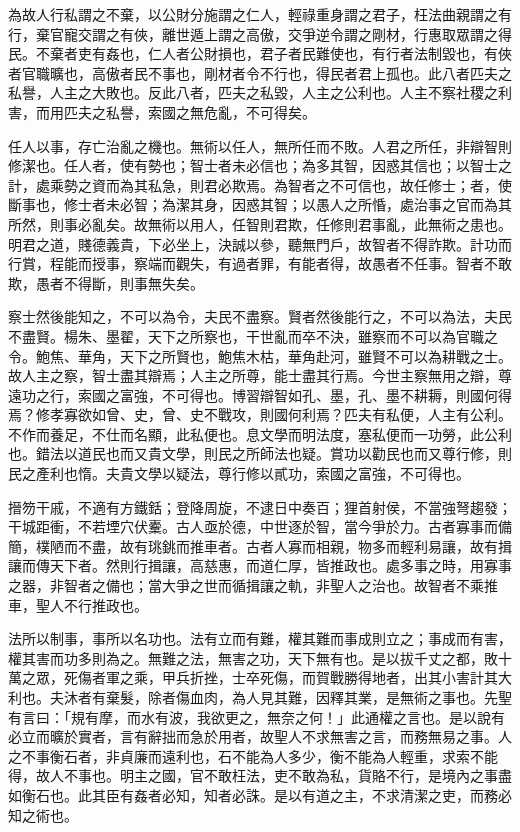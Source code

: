 
\begin{pinyinscope}
為故人行私謂之不棄，以公財分施謂之仁人，輕祿重身謂之君子，枉法曲親謂之有行，棄官寵交謂之有俠，離世遁上謂之高傲，交爭逆令謂之剛材，行惠取眾謂之得民。不棄者吏有姦也，仁人者公財損也，君子者民難使也，有行者法制毀也，有俠者官職曠也，高傲者民不事也，剛材者令不行也，得民者君上孤也。此八者匹夫之私譽，人主之大敗也。反此八者，匹夫之私毀，人主之公利也。人主不察社稷之利害，而用匹夫之私譽，索國之無危亂，不可得矣。

任人以事，存亡治亂之機也。無術以任人，無所任而不敗。人君之所任，非辯智則修潔也。任人者，使有勢也；智士者未必信也；為多其智，因惑其信也；以智士之計，處乘勢之資而為其私急，則君必欺焉。為智者之不可信也，故任修士；者，使斷事也，修士者未必智；為潔其身，因惑其智；以愚人之所惛，處治事之官而為其所然，則事必亂矣。故無術以用人，任智則君欺，任修則君事亂，此無術之患也。明君之道，賤德義貴，下必坐上，決誠以參，聽無門戶，故智者不得詐欺。計功而行賞，程能而授事，察端而觀失，有過者罪，有能者得，故愚者不任事。智者不敢欺，愚者不得斷，則事無失矣。

察士然後能知之，不可以為令，夫民不盡察。賢者然後能行之，不可以為法，夫民不盡賢。楊朱、墨翟，天下之所察也，干世亂而卒不決，雖察而不可以為官職之令。鮑焦、華角，天下之所賢也，鮑焦木枯，華角赴河，雖賢不可以為耕戰之士。故人主之察，智士盡其辯焉；人主之所尊，能士盡其行焉。今世主察無用之辯，尊遠功之行，索國之富強，不可得也。博習辯智如孔、墨，孔、墨不耕耨，則國何得焉？修孝寡欲如曾、史，曾、史不戰攻，則國何利焉？匹夫有私便，人主有公利。不作而養足，不仕而名顯，此私便也。息文學而明法度，塞私便而一功勞，此公利也。錯法以道民也而又貴文學，則民之所師法也疑。賞功以勸民也而又尊行修，則民之產利也惰。夫貴文學以疑法，尊行修以貳功，索國之富強，不可得也。

搢笏干戚，不適有方鐵銛；登降周旋，不逮日中奏百；狸首射侯，不當強弩趨發；干城距衝，不若堙穴伏櫜。古人亟於德，中世逐於智，當今爭於力。古者寡事而備簡，樸陋而不盡，故有珧銚而推車者。古者人寡而相親，物多而輕利易讓，故有揖讓而傳天下者。然則行揖讓，高慈惠，而道仁厚，皆推政也。處多事之時，用寡事之器，非智者之備也；當大爭之世而循揖讓之軌，非聖人之治也。故智者不乘推車，聖人不行推政也。

法所以制事，事所以名功也。法有立而有難，權其難而事成則立之；事成而有害，權其害而功多則為之。無難之法，無害之功，天下無有也。是以拔千丈之都，敗十萬之眾，死傷者軍之乘，甲兵折挫，士卒死傷，而賀戰勝得地者，出其小害計其大利也。夫沐者有棄髮，除者傷血肉，為人見其難，因釋其業，是無術之事也。先聖有言曰：「規有摩，而水有波，我欲更之，無奈之何！」此通權之言也。是以說有必立而曠於實者，言有辭拙而急於用者，故聖人不求無害之言，而務無易之事。人之不事衡石者，非貞廉而遠利也，石不能為人多少，衡不能為人輕重，求索不能得，故人不事也。明主之國，官不敢枉法，吏不敢為私，貨賂不行，是境內之事盡如衡石也。此其臣有姦者必知，知者必誅。是以有道之主，不求清潔之吏，而務必知之術也。


\end{pinyinscope}
